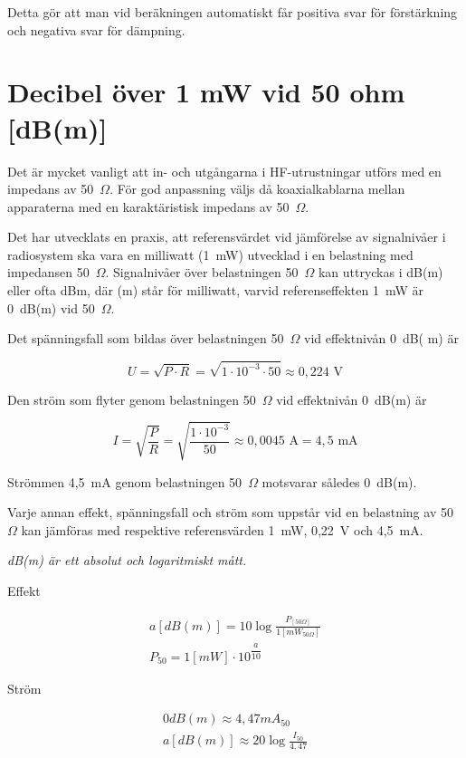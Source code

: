 Detta gör att man vid beräkningen automatiskt får positiva svar för
förstärkning och negativa svar för dämpning.

\section{Decibel över 1 mW vid 50 ohm [dB(m)]}

Det är mycket vanligt att in- och utgångarna i HF-utrustningar utförs
med en impedans av 50~\(\Omega\).
För god anpassning väljs då koaxialkablarna mellan apparaterna med en
karaktäristisk impedans av 50~\(\Omega\).

Det har utvecklats en praxis, att referensvärdet vid jämförelse av signalnivåer
i radiosystem ska vara en milliwatt (1~mW) utvecklad i en belastning med
impedansen 50~\(\Omega\).
Signalnivåer över belastningen 50~\(\Omega\) kan uttryckas i dB(m) eller ofta
dBm, där (m) står för milliwatt, varvid referenseffekten 1~mW är 0~dB(m) vid
50~\(\Omega\).

Det spänningsfall som bildas över belastningen 50~\(\Omega\) vid effektnivån
0~dB( m) är

\[U = \sqrt{P\cdot R} = \sqrt{1\cdot 10^{-3} \cdot 50} \approx 0,224 \text{ V}\]

Den ström som flyter genom belastningen 50~\(\Omega\) vid effektnivån 0~dB(m)
är

\[
I = \sqrt{\frac{P}{R}} = \sqrt{\frac{1\cdot 10^{-3}}{50}} \approx 0,0045 \text{ A} = 4,5 \text{ mA}
\]

Strömmen 4,5~mA genom belastningen 50~\(\Omega\) motsvarar således 0~dB(m).

Varje annan effekt, spänningsfall och ström som uppstår vid en
belastning av 50 \(\Omega\) kan jämföras med respektive referensvärden 1~mW,
0,22~V och 4,5~mA.

\emph{dB(m) är ett absolut och logaritmiskt mått.}

Effekt

\begin{gather*}
	a [dB(m)] = 10 \log\frac{P_{[50 \Omega]}}{1[mW_{50 \Omega}]} \\
	P_{50} = 1 [mW] \cdot 10^{\dfrac{a}{10}}
\end{gather*}

Ström

\begin{gather*}
	0 dB(m) \approx 4,47 mA_{50} \\
	a [dB(m)] \approx 20 \log\frac{I_{50}}{4,47}
\end{gather*}

